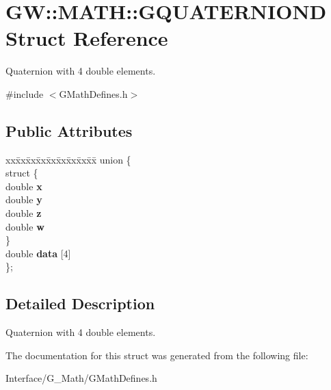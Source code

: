\hypertarget{structGW_1_1MATH_1_1GQUATERNIOND}{}\section{GW\+:\+:M\+A\+TH\+:\+:G\+Q\+U\+A\+T\+E\+R\+N\+I\+O\+ND Struct Reference}
\label{structGW_1_1MATH_1_1GQUATERNIOND}


Quaternion with 4 double elements.  




{\ttfamily \#include $<$G\+Math\+Defines.\+h$>$}

\subsection*{Public Attributes}
\begin{DoxyCompactItemize}
\item 
\mbox{\label{structGW_1_1MATH_1_1GQUATERNIOND_ae549f754f2f182bce994f6e7f1daf553}} 
\begin{tabbing}
xx\=xx\=xx\=xx\=xx\=xx\=xx\=xx\=xx\=\kill
union \{\\
\mbox{\label{unionGW_1_1MATH_1_1GQUATERNIOND_1_1_0D24_ae5bbc9fad6ef88c3f9c1a5171c52741d}} 
\>struct \{\\
\>\>double {\bfseries x}\\
\>\>double {\bfseries y}\\
\>\>double {\bfseries z}\\
\>\>double {\bfseries w}\\
\>\} \\
\>double {\bfseries data} \mbox{[}4\mbox{]}\\
\}; \\

\end{tabbing}\end{DoxyCompactItemize}


\subsection{Detailed Description}
Quaternion with 4 double elements. 

The documentation for this struct was generated from the following file\+:\begin{DoxyCompactItemize}
\item 
Interface/\+G\+\_\+\+Math/G\+Math\+Defines.\+h\end{DoxyCompactItemize}
